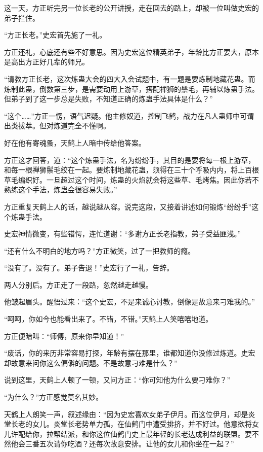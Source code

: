 
\begin{this_body}

这一天，方正听完另一位长老的公开讲授，走在回去的路上，却被一位叫做史宏的弟子拦住。

“方正长老。”史宏首先施了一礼。

方正还礼，心底还有些不好意思。因为史宏这位精英弟子，年龄比方正要大，原本是高出方正好几辈的师兄。

“请教方正长老，这次炼蛊大会的四大入会试题中，有一题是要炼制地藏花蛊。而炼制此蛊，倒数第三步，是需要动用上游草，搭配禅狮的鬃毛，再辅以炼蛊手法。但弟子到了这一步总是失败，不知道正确的炼蛊手法具体是什么？”

“这个……”方正一愣，语气迟疑。他主修奴道，控制飞鹤，战力在凡人蛊师中可谓出类拔萃。但对炼道完全不懂啊。

好在他有寄魂蚤，天鹤上人暗中传给他答案。

方正这才回答，道：“这个炼蛊手法，名为纷纷手，其目的是要将每一根上游草，和每一根禅狮鬃毛绞在一起。要炼制地藏花蛊，须得在三十个呼吸内内，将上百根草毛编织好。一旦超过这个时间，炼蛊的火焰就会将这些草、毛烤焦。因此你若不熟练这个手法，炼蛊会很容易失败。”

方正重复天鹤上人的话，越说越从容。说完这段，又接着讲述如何锻炼“纷纷手”这个炼蛊手法。

史宏神情微变，有些错愕，连忙道谢：“多谢方正长老指教，弟子受益匪浅。”

“还有什么不明白的地方吗？”方正微笑，过了一把教师的瘾。

“没有了。没有了。弟子告退！”史宏行了一礼，告辞。

两人分别后。方正走了一段路，忽然越走越慢。

他皱起眉头。醒悟过来：“这个史宏，不是来诚心讨教，倒像是故意来刁难我的。”

“呵呵，你如今也能看出来了。不错，不错。”天鹤上人笑嘻嘻地道。

方正便暗叫：“师傅，原来你早知道！”

“废话，你的来历非常容易打探，年龄有摆在那里，谁都知道你没修过炼道。史宏却故意来问你这么偏僻的问题。不是故意刁难是什么？”

说到这里，天鹤上人顿了一顿，又问方正：“你可知他为什么要刁难你？”

“为什么？”方正感觉莫名其妙。

天鹤上人朗笑一声，叙述缘由：“因为史宏喜欢女弟子伊月。而这位伊月，却是炎堂长老的女儿。炎堂长老势单力孤，在仙鹤门中遭受排挤，并不好过。他意欲将女儿许配给你，拉帮结派，和你这位仙鹤门史上最年轻的长老达成利益的联盟。要不然他会三番五次请你吃酒？还每次故意安排。让他的女儿和你坐在一起？”


\end{this_body}
